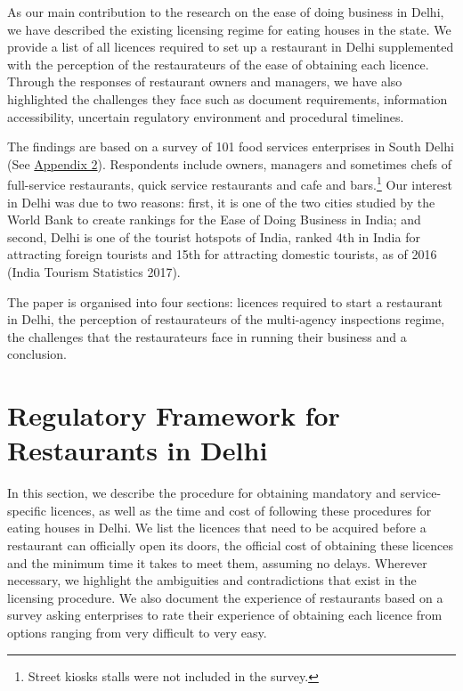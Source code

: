 \documentclass[a4paper, 12pt]{article}
\begin{document}
                    As our main contribution to the research on the ease of doing business in Delhi, we have described the existing licensing regime for eating houses in the state. We provide a list of all licences required to set up a restaurant in Delhi supplemented with 
the perception of the restaurateurs of the ease of obtaining each licence. Through the responses of restaurant owners and managers, we have also highlighted the challenges they face such as document requirements, information accessibility, uncertain regulatory 
environment and procedural timelines.
                    
                    The findings are based on a survey of 101 food services enterprises in South Delhi (See \hyperref[Appendix 2]{Appendix 2}). Respondents include owners, managers and sometimes chefs of full-service restaurants, quick service restaurants and cafe 
and bars.\footnote{Street kiosks stalls were not included in the survey.} Our interest in Delhi was due to two reasons: first, it is one of the two cities studied by the World Bank to create rankings for the Ease of Doing Business in India; and second, Delhi is one of the 
tourist hotspots of India, ranked 4th in India for attracting foreign tourists and 15th for attracting domestic tourists, as of 2016 (India Tourism Statistics 2017).
                    
                    The paper is organised into four sections: licences required to start a restaurant in Delhi, the perception of restaurateurs of the multi-agency inspections regime, the challenges that the restaurateurs face in running their business and a conclusion. 
            
                                        
                    \section{Regulatory Framework for Restaurants in Delhi}
                    \label{sec:1}
                    In this section, we describe the procedure for obtaining mandatory and service-specific licences, as well as the time and cost of following these procedures for eating houses in Delhi. We list the licences that need to be acquired before a restaurant can 
officially open its doors, the official cost of obtaining these licences and the minimum time it takes to meet them, assuming no delays. Wherever necessary, we highlight the ambiguities and contradictions that exist in the licensing procedure. We also document the 
experience of restaurants based on a survey asking enterprises to rate their experience of obtaining each licence from options ranging from very difficult to very easy.
                    
\end{document}

